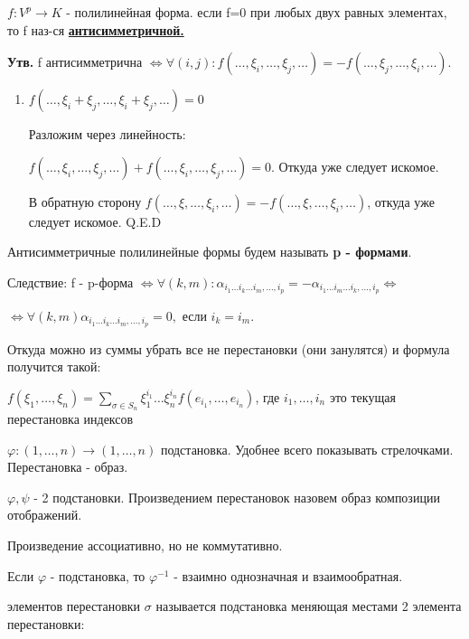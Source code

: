 \(f: V^p \rightarrow K\) - полилинейная форма. если f=0 при любых двух равных элементах, то f наз-ся \uline{\textbf{антисимметричной.}}

\textbf{Утв.} f антисимметрична \(\Leftrightarrow \forall(i,j): f(\ldots,\xi_i,\ldots, \xi_j,\ldots) =- f(\ldots,\xi_j,\ldots, \xi_i,\ldots) \).

\begin{enumerate}
    \item[] \prooff{}

          \(f(\ldots, \xi_i + \xi_j,\ldots, \xi_i + \xi_j,\ldots) = 0\)

          Разложим через линейность:

          \(f(\ldots, \xi_i,\ldots,  \xi_j,\ldots)  + f(\ldots, \xi_i,\ldots,  \xi_j,\ldots)  = 0\). Откуда уже следует искомое.

          В обратную сторону  \(f(\ldots, \xi ,\ldots, \xi_i,\ldots) = - f(\ldots, \xi ,\ldots, \xi_i,\ldots)\), откуда уже следует искомое.  Q.E.D
\end{enumerate}

Антисимметричные полилинейные формы будем называть \textbf{p - формами}.

Следствие: f - p-форма \(\Leftrightarrow \forall  (k,m): \alpha_{i_1 \ldots i_k \ldots i_m, \ldots, i_p} = - \alpha_{i_1 \ldots i_m \ldots i_k, \ldots, i_p} \Leftrightarrow\)

\(\Leftrightarrow \forall (k,m) \alpha_{i_1 \ldots i_k \ldots i_m, \ldots, i_p}=0,\) если \(i_k = i_m\).


Откуда можно из суммы убрать все не перестановки (они занулятся) и формула получится такой:

\(f(\xi_1,\ldots,\xi_n) =  \sum\limits_{\sigma \in S_n} \xi_1^{i_1} \ldots \xi_n^{i_n} f(e_{i_1},\ldots,e_{i_n})\), где $i_1,\ldots,i_n$ это текущая перестановка индексов


\(\varphi: (1, \ldots,n) \rightarrow (1,\ldots,n)\) подстановка. Удобнее всего показывать стрелочками. Перестановка - образ.

\(\varphi, \psi\) - 2 подстановки. Произведением перестановок назовем образ композиции отображений.

Произведение ассоциативно, но не коммутативно.

Если $\varphi $ - подстановка, то $\varphi^{-1}$ - взаимно однозначная и взаимообратная.

 элементов перестановки \(\sigma\) называется подстановка меняющая местами 2 элемента перестановки:


